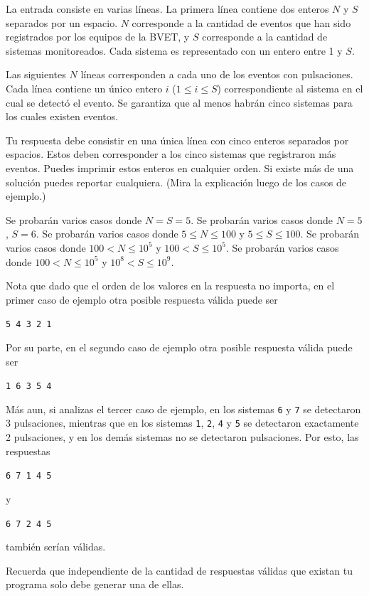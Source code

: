\documentclass{oci}
\begin{document}
\begin{inputDescription}
La entrada consiste en varias líneas.
La primera línea contiene dos enteros $N$ y $S$ separados por un espacio.
$N$ corresponde a la cantidad de eventos que han sido registrados por los equipos de la BVET, y
$S$ corresponde a la cantidad de sistemas monitoreados.
Cada sistema es representado con un entero entre 1 y $S$.

Las siguientes $N$ líneas corresponden a cada uno de los eventos con pulsaciones.
Cada línea contiene un único entero $i$ ($1 \le i \le S$) correspondiente al sistema en el cual se detectó el evento.
Se garantiza que al menos habrán cinco sistemas para los cuales existen eventos.
\end{inputDescription}

\begin{outputDescription}
  Tu respuesta debe consistir en una única línea con cinco enteros separados por espacios.
  Estos deben corresponder a los cinco sistemas que registraron más eventos.
  Puedes imprimir estos enteros en cualquier orden.
  Si existe más de una solución puedes reportar cualquiera. (Mira la explicación luego de los casos de ejemplo.)
\end{outputDescription}

\begin{scoreDescription}
   Se probarán varios casos donde $N=S=5$.
   Se probarán varios casos donde $N=5$, $S=6$.
   Se probarán varios casos donde $5 \le N \le 100$ y $5 \le S \le 100$.
   Se probarán varios casos donde $100 < N \le 10^5$ y $100 < S \le 10^5$.
   Se probarán varios casos donde $100 < N \le 10^5$ y $10^8 < S \le 10^9$.
\end{scoreDescription}

\begin{sampleDescription}
\end{sampleDescription}

Nota que dado que el orden de los valores en la respuesta no importa, en el primer caso de ejemplo otra 
posible respuesta v\'alida puede ser
\begin{center}
\texttt{5 4 3 2 1}
\end{center}
Por su parte, en el segundo caso de ejemplo otra posible respuesta v\'alida puede ser
\begin{center}
\texttt{1 6 3 5 4}
\end{center}

M\'as aun, si analizas el tercer caso de ejemplo, en los sistemas \texttt{6} y \texttt{7} se detectaron
3 pulsaciones, mientras que en los sistemas \texttt{1}, \texttt{2}, \texttt{4} y \texttt{5} 
se detectaron exactamente 2 pulsaciones, y en los demás sistemas no se detectaron pulsaciones. 
Por esto, las respuestas 
\begin{center}
\texttt{6 7 1 4 5}
\end{center}
y
\begin{center}
\texttt{6 7 2 4 5}
\end{center}
también serían válidas. 

Recuerda que independiente de la cantidad de respuestas válidas que existan tu programa
solo debe generar una de ellas.
\end{document}
